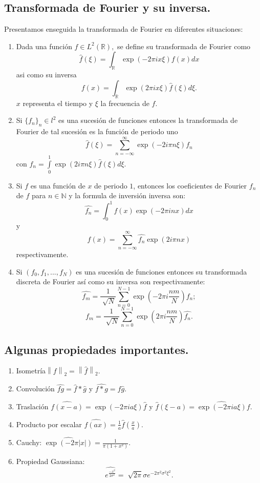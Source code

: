 \documentclass[a4paper]{article}
\begin{document}
\subsection{\sffamily Transformada de Fourier y su inversa.}
Presentamos enseguida la transformada de Fourier en diferentes situaciones:\\
\begin{enumerate}
\item Dada una función $f\in L^{2}\mathbb{(R)},$ se define su transformada de Fourier como $$
\widehat{f}(\xi)=\int_{\mathbb{R}} \exp(-2\pi ix\xi)f(x)dx
$$ asi como su inversa
$$
f(x)=\int_{\mathbb{R}} \exp(2\pi i x\xi) \widehat{f}(\xi)d\xi.
$$
$x$ representa el tiempo y $\xi$ la frecuencia de $f.$
\\
\item Si $\{f_{n}\}_{n} \in l^{2}$ es una sucesión de funciones entonces la transformada de Fourier de tal sucesión es la función de periodo uno
$$
\widehat{f}(\xi)=\sum_{n=-\infty}^{\infty} \exp(-2i\pi n\xi)f_{n}
$$ con $f_{n}=\int\limits_{0}^{1}\exp(2i\pi n\xi) \widehat{f}(\xi)d\xi.$
\\
\item Si $f$ es una función de $x$ de periodo $1$, entonces los coeficientes de Fourier $f_{n}$ de $f$ para $n\in \mathbb{N}$ y la formula de inversión inversa son:
$$
\widehat{f_{n}}=\int_{0}^{1}f(x)\exp(-2\pi inx)dx
$$ y $$
f(x)=\sum_{n=-\infty}^{\infty} \widehat{f_{n}}\exp(2i\pi nx)
$$ respectivamente.
\\
\item Si $(f_{0},f_{1},...,f_{N})$ es una sucesión de funciones entonces su transformada discreta de Fourier así como su inversa son respectivamente:
$$
\widehat{f_{m}}=\frac{1}{\sqrt[]{N}}\sum_{n=0}^{N-1}\exp\left(-2\pi i\frac{nm}{N}\right)f_{n};
$$ $$
f_{m}=\frac{1}{\sqrt[]{N}}\sum_{n=0}^{N-1}\exp\left(2\pi i\frac{nm}{N}\right)\widehat{f_{n}}.
$$
\end{enumerate}

\subsection{\sffamily Algunas propiedades importantes.}
\begin{enumerate}
\item Isometría$\left \| f \right \|_{2}=\left \| \widehat{f} \right \|_{2}.$
\item Convolución $\widehat{fg}=\widehat{f} \ast \widehat{g}$ y $\widehat{f\ast g}=\widehat{f} \widehat{g}.$
\item Traslación $\widehat{f(x-a)}=\exp(-2\pi ia\xi)\widehat{f}$ y $\widehat{f}(\xi-a)=\widehat{\exp(-2\pi ia\xi)}f.$ 
\item Producto por escalar $\widehat{f(ax)}=\frac{1}{a}\widehat{f}(\frac{x}{a}).$
\item Cauchy: $\widehat{\exp(-2\pi |x|)}=\frac{1}{\pi(1+x^{2})}.$
\item Propiedad Gaussiana:
$$
\widehat{e^{\frac{-x^{2}}{2\sigma ^{2}}}}=\sqrt[]{2\pi}\sigma e^{-2\pi^{2}\sigma^{2}\xi^{2}}.
$$
\end{enumerate}
\end{document}
